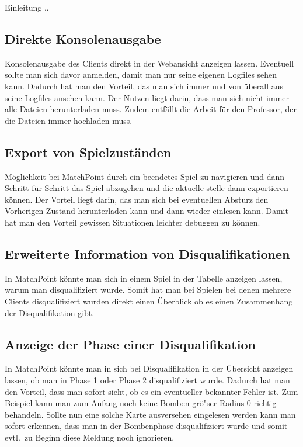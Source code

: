 Einleitung ..

\subsection{Direkte Konsolenausgabe}\label{subsec:direkte-konsolenausgabe}
Konsolenausgabe des Clients direkt in der Webansicht anzeigen lassen.
Eventuell sollte man sich davor anmelden, damit man nur seine eigenen Logfiles sehen kann.
Dadurch hat man den Vorteil, das man sich immer und von \"uberall aus seine Logfiles ansehen kann.
Der Nutzen liegt darin, dass man sich nicht immer alle Dateien herunterladen muss.
Zudem entf\"allt die Arbeit f\"ur den Professor, der die Dateien immer hochladen muss.

\subsection{Export von Spielzust\"anden}\label{subsec:export-von-spielzustaenden}
M\"oglichkeit bei MatchPoint durch ein beendetes Spiel zu navigieren und dann Schritt f\"ur Schritt das Spiel abzugehen und die aktuelle stelle dann exportieren k\"onnen.
Der Vorteil liegt darin, das man sich bei eventuellen Absturz den Vorherigen Zustand herunterladen kann und dann wieder einlesen kann.
Damit hat man den Vorteil gewissen Situationen leichter debuggen zu k\"onnen.

\subsection{Erweiterte Information von Disqualifikationen}\label{subsec:erweiterte-information-von-disqualifikationen}
In MatchPoint k\"onnte man sich in einem Spiel in der Tabelle anzeigen lassen, warum man disqualifiziert wurde.
Somit hat man bei Spielen bei denen mehrere Clients disqualifiziert wurden direkt einen \"Uberblick ob es einen Zusammenhang der Disqualifikation gibt.

\subsection{Anzeige der Phase einer Disqualifikation}\label{subsec:anzeige-der-phase-einer-disqualifikation}
In MatchPoint k\"onnte man in sich bei Disqualifikation in der \"Ubersicht anzeigen lassen, ob man in Phase 1 oder Phase 2 disqualifiziert wurde.
Dadurch hat man den Vorteil, dass man sofort sieht, ob es ein eventueller bekannter Fehler ist.
Zum Beispiel kann man zum Anfang noch keine Bomben gr\"o"ser Radius 0 richtig behandeln.
Sollte nun eine solche Karte ausversehen eingelesen werden kann man sofort erkennen, dass man in der Bombenphase disqualifiziert wurde und somit evtl.\ zu Beginn diese Meldung noch ignorieren.

